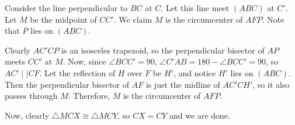 Consider the line perpendicular to $BC$ at $C$. Let this line meet $(ABC)$ at $C'$. Let $M$ be the midpoint of $CC'$. We claim $M$ is the circumcenter of $AFP$. Note that $P$ lies on $(ABC)$.

Clearly $AC'CP$ is an isosceles trapezoid, so the perpendicular bisector of $AP$ meets $CC'$ at $M$. Now, since $\angle BCC' = 90$, $\angle C'AB = 180 - \angle BCC' = 90$, so $AC' \mid\mid CF$. Let the reflection of $H$ over $F$ be $H'$, and notice $H'$ lies on $(ABC)$. Then the perpendicular bisector of $AF$ is just the midline of $AC'CH'$, so it also passes through $M$. Therefore, $M$ is the circumcenter of $AFP$.

Now, clearly $\triangle MCX \cong \triangle MCY$, so $CX = CY$ and we are done.